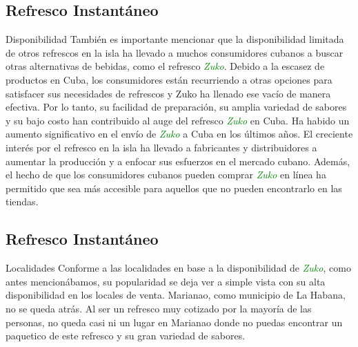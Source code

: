 \subsection{Refresco Instantáneo}
\begin{frame}[fragile]{Disponibilidad}
  También es importante mencionar que la disponibilidad limitada de otros refrescos en la isla ha llevado a muchos consumidores cubanos a buscar otras alternativas de bebidas, como el refresco \textit{\Large\textcolor{green}{Zuko}}. 
  Debido a la escasez de productos en Cuba, los consumidores están recurriendo a otras opciones para satisfacer sus necesidades de refrescos y Zuko ha llenado ese vacío de manera efectiva. 
  Por lo tanto, su facilidad de preparación, su amplia variedad de sabores y su bajo costo han contribuido al auge del refresco \textit{\Large\textcolor{green}{Zuko}} en Cuba.
  Ha habido un aumento significativo en el envío de \textit{\Large\textcolor{green}{Zuko}} a Cuba en los últimos años. 
  El creciente interés por el refresco en la isla ha llevado a fabricantes y distribuidores a aumentar la producción y a enfocar sus esfuerzos en el mercado cubano. 
  Además, el hecho de que los consumidores cubanos pueden comprar \textit{\Large\textcolor{green}{Zuko}} en línea ha permitido que sea más accesible para aquellos que no pueden encontrarlo en las tiendas.
\end{frame}

\subsection{Refresco Instantáneo}
\begin{frame}[fragile]{Localidades}
  Conforme a las localidades en base a la disponibilidad de \textit{\Large\textcolor{green}{Zuko}}, como antes mencionábamos, su popularidad se deja ver a simple vista con su alta disponibilidad en los locales de venta. 
  Marianao, como municipio de La Habana, no se queda atrás. 
  Al ser un refresco muy cotizado por la mayoría de las personas, no queda casi ni un lugar en Marianao donde no puedas encontrar un paquetico de este refresco y su gran variedad de sabores.
\end{frame}

